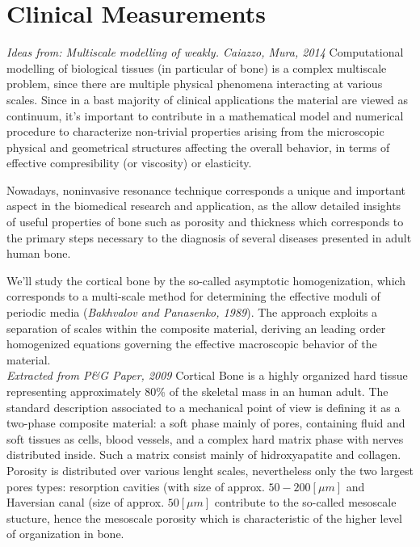 \chapter{Clinical Measurements}
\textit{Ideas from: Multiscale modelling of weakly. Caiazzo, Mura, 2014}
Computational modelling of biological tissues (in particular of bone) is a complex multiscale problem, since there are multiple physical phenomena interacting at various scales. Since in a bast majority of clinical applications the material are viewed as continuum, it's important to contribute in a mathematical model and numerical procedure to characterize non-trivial properties arising from the microscopic physical and geometrical structures affecting the overall behavior, in terms of effective compresibility (or viscosity) or elasticity. 

Nowadays, noninvasive resonance technique corresponds a unique and important aspect in the biomedical research and application, as the allow detailed insights of useful properties of bone such as porosity and thickness which corresponds to the primary steps necessary to the diagnosis of several diseases presented in adult human bone.

We'll study the cortical bone by the so-called asymptotic homogenization, which corresponds to a multi-scale method for determining the effective moduli of periodic media (\textit{Bakhvalov and Panasenko, 1989}). The approach exploits a separation of scales within the composite material, deriving an leading order homogenized equations governing the effective macroscopic behavior of the material.\\

\textit{Extracted from P\&G Paper, 2009} Cortical Bone is a highly organized hard tissue representing approximately 80\% of the skeletal mass in an human adult. The standard description associated to a mechanical point of view is defining it as a two-phase composite material: a soft phase mainly of pores, containing fluid and soft tissues as cells, blood vessels, and a complex hard matrix phase with nerves distributed inside. Such a matrix consist mainly of hidroxyapatite and collagen. Porosity is distributed over various lenght scales, nevertheless only the two largest pores types: resorption cavities (with size of approx. $50-200 [\mu m]$ and Haversian canal (size of approx. $50 [ \mu m ]$ contribute to the so-called mesoscale stucture, hence the mesoscale porosity which is characteristic of the higher level of organization in bone. 

